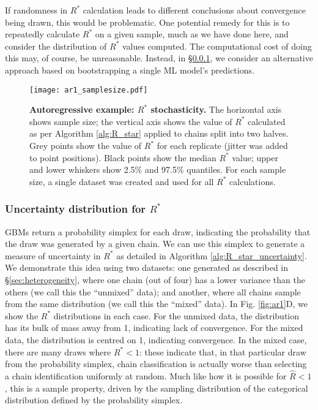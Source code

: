\documentclass{article}
\begin{document}
If randomness in $R^*$ calculation leads to different conclusions about convergence being drawn, this would be problematic. One potential remedy for this is to repeatedly calculate $R^*$ on a given sample, much as we have done here, and consider the distribution of $R^*$ values computed. The computational cost of doing this may, of course, be unreasonable. Instead, in \S\ref{sec:heterogeneity_uncertainty}, we consider an alternative approach based on bootstrapping a single ML model's predictions.

\begin{figure}[!htb]
	\centerline{\texttt{[image: ar1\_samplesize.pdf]}}
	\caption{\textbf{Autoregressive example: $R^*$ stochasticity.} The horizontal axis shows sample size; the vertical axis shows the value of $R^*$ calculated as per Algorithm \ref{alg:R_star} applied to chains split into two halves. Grey points show the value of $R^*$ for each replicate (jitter was added to point positions). Black points show the median $R^*$ value; upper and lower whiskers show 2.5\% and 97.5\% quantiles. For each sample size, a single dataset was created and used for all $R^*$ calculations.}
	\label{fig:ar1_samplesize}
\end{figure}

\subsubsection{Uncertainty distribution for $R^*$}\label{sec:heterogeneity_uncertainty}
GBMs return a probability simplex for each draw, indicating the probability that the draw was generated by a given chain. We can use this simplex to generate a measure of uncertainty in $R^*$ as detailed in Algorithm \ref{alg:R_star_uncertainty}. We demonstrate this idea using two datasets: one generated as described in \S\ref{sec:heterogeneity}, where one chain (out of four) has a lower variance than the others (we call this the ``unmixed'' data); and another, where all chains sample from the same distribution (we call this the ``mixed'' data). In Fig. \ref{fig:ar1}D, we show the $R^*$ distributions in each case. For the unmixed data, the distribution has its bulk of mass away from 1, indicating lack of convergence. For the mixed data, the distribution is centred on 1, indicating convergence. In the mixed case, there are many draws where $R^*<1$: these indicate that, in that particular draw from the probability simplex, chain classification is actually worse than selecting a chain identification uniformly at random. Much like how it is possible for $\hat{R}<1$, this is a sample property, driven by the sampling distribution of the categorical distribution defined by the probability simplex.
\end{document}

